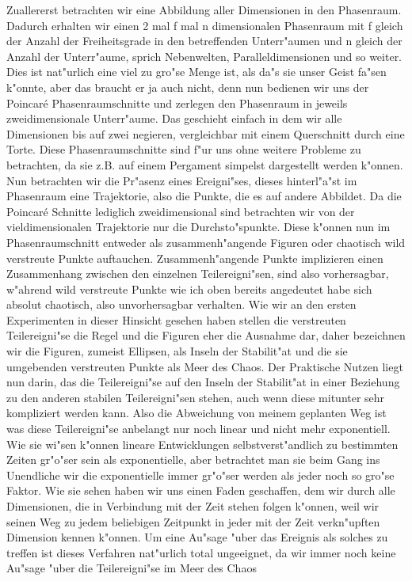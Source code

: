 \documentclass[a5paper,8pt]{book}
\begin{document}
Zuallererst betrachten wir eine Abbildung aller Dimensionen in den Phasenraum. Dadurch erhalten wir einen 2 mal f mal n dimensionalen Phasenraum mit f gleich der Anzahl der Freiheitsgrade in den betreffenden Unterr"aumen und n gleich der Anzahl der Unterr"aume, sprich Nebenwelten, Paralleldimensionen und so weiter. Dies ist nat"urlich eine viel zu gro"se Menge ist, als da"s sie unser Geist fa"sen k"onnte, aber das braucht er ja auch nicht, denn nun bedienen wir uns der Poincaré Phasenraumschnitte und zerlegen den Phasenraum in jeweils zweidimensionale Unterr"aume. Das geschieht einfach in dem wir alle Dimensionen bis auf zwei negieren, vergleichbar mit einem Querschnitt durch eine Torte. Diese Phasenraumschnitte sind f"ur uns ohne weitere Probleme zu betrachten, da sie z.B. auf einem Pergament simpelst dargestellt werden k"onnen.
Nun betrachten wir die Pr"asenz eines Ereigni"ses, dieses hinterl"a"st im Phasenraum eine Trajektorie, also die Punkte, die es auf andere Abbildet. Da die Poincaré Schnitte lediglich zweidimensional sind betrachten wir von der vieldimensionalen Trajektorie nur die Durchsto"spunkte. Diese k"onnen nun im Phasenraumschnitt entweder als zusammenh"angende Figuren oder chaotisch wild verstreute Punkte auftauchen. Zusammenh"angende Punkte implizieren einen Zusammenhang zwischen den einzelnen Teilereigni"sen, sind also vorhersagbar, w"ahrend wild verstreute Punkte wie ich oben bereits angedeutet habe sich absolut chaotisch, also unvorhersagbar verhalten. Wie wir an den ersten Experimenten in dieser Hinsicht gesehen haben stellen die verstreuten Teilereigni"se die Regel und die Figuren eher die Ausnahme dar, daher bezeichnen wir die Figuren, zumeist Ellipsen, als Inseln der Stabilit"at und die sie umgebenden verstreuten Punkte als Meer des Chaos.
Der Praktische Nutzen liegt nun darin, das die Teilereigni"se auf den Inseln der Stabilit"at in einer Beziehung zu den anderen stabilen Teilereigni"sen stehen, auch wenn diese mitunter sehr kompliziert werden kann. Also die Abweichung von meinem geplanten Weg ist was diese Teilereigni"se 
anbelangt nur noch linear und nicht mehr exponentiell. Wie sie wi"sen k"onnen lineare Entwicklungen selbstverst"andlich zu bestimmten Zeiten gr"o"ser sein als exponentielle, aber betrachtet man sie beim Gang ins Unendliche wir die exponentielle immer gr"o"ser werden als jeder noch so gro"se Faktor. Wie sie sehen haben wir uns einen Faden geschaffen, dem wir durch alle Dimensionen, die in Verbindung mit der Zeit stehen folgen k"onnen, weil wir seinen Weg zu jedem beliebigen Zeitpunkt in jeder mit der Zeit verkn"upften Dimension kennen k"onnen. Um eine Au"sage "uber das Ereignis als solches zu treffen ist dieses Verfahren nat"urlich total ungeeignet, da wir immer noch keine Au"sage "uber die Teilereigni"se im Meer des Chaos 
\end{document}
